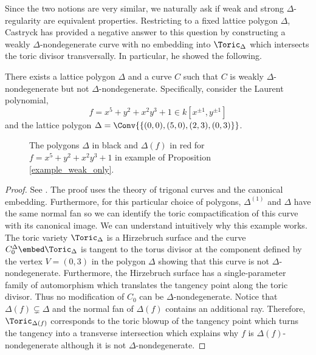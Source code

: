 Since the two notions are very similar, we naturally ask if weak and strong $\Delta$-regularity are equivalent properties. Restricting to a fixed lattice polygon $\Delta$, Castryck has provided a negative answer to this question by constructing a weakly $\Delta$-nondegenerate curve with no embedding into $\Toric_\Delta$ which intersects the toric divisor transversally. In particular, he showed the following.

\begin{prop} \label{example_weak_only}
There exists a lattice polygon $\Delta$ and a curve $C$ such that $C$ is weakly $\Delta$-nondegenerate but not $\Delta$-nondegenerate. Specifically, consider the Laurent polynomial,
\[ f = x^5 + y^2 + x^2 y^3 + 1 \in k[x^{\pm 1}, y^{\pm 1}] \]
and the lattice polygon $\Delta = \Conv{\{ (0,0), (5, 0), (2, 3), (0,3) \}}$.
\begin{figure}
\begin{center}
\end{center}
\caption{The polygons $\Delta$ in black and $\Delta(f)$ in red for $f = x^5 + y^2 + x^2 y^3 + 1$ in example of Proposition \ref{example_weak_only}.}
\end{figure}
\end{prop}

\begin{proof}
See \cite[Lemma 4.4]{WC_linear_pencils}. The proof uses the theory of trigonal curves and the canonical embedding. Furthermore, for this particular choice of polygons, $\Delta^{(1)}$ and $\Delta$ have the same normal fan so we can identify the toric compactification of this curve with its canonical image. We can understand intuitively why this example works. The toric variety $\Toric_{\Delta}$ is a Hirzebruch surface and the curve $C_0^\Delta \embed \Toric_{\Delta}$ is tangent to the torus divisor at the component defined by the vertex $V = (0,3)$ in the polygon $\Delta$ showing that this curve is not $\Delta$-nondegenerate. Furthermore, the Hirzebruch surface has a single-parameter family of automorphism which translates the tangency point along the toric divisor. Thus no modification of $C_0$ can be $\Delta$-nondegenerate. Notice that $\Delta(f) \subsetneq \Delta$ and the normal fan of $\Delta(f)$ contains an additional ray. Therefore, $\Toric_{\Delta(f)}$ corresponds to the toric blowup of the tangency point which turns the tangency into a transverse intersection which explains why $f$ is $\Delta(f)$-nondegenerate although it is not $\Delta$-nondegenerate.
\end{proof}

